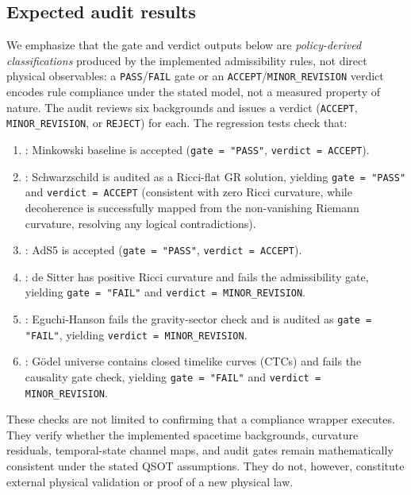 \subsection{Expected audit results}
We emphasize that the gate and verdict outputs below are \emph{policy-derived classifications} produced by the implemented admissibility rules, not direct physical observables: a \texttt{PASS}/\texttt{FAIL} gate or an \texttt{ACCEPT}/\texttt{MINOR\_REVISION} verdict encodes rule compliance under the stated model, not a measured property of nature. The audit reviews six backgrounds and issues a verdict (\texttt{ACCEPT}, \texttt{MINOR\_REVISION}, or \texttt{REJECT}) for each. The regression tests check that:
\begin{enumerate}
  \item {}: Minkowski baseline is accepted (\texttt{gate = "PASS"}, \texttt{verdict = ACCEPT}).
  \item {}: Schwarzschild is audited as a Ricci-flat GR solution, yielding \texttt{gate = "PASS"} and \texttt{verdict = ACCEPT} (consistent with zero Ricci curvature, while decoherence is successfully mapped from the non-vanishing Riemann curvature, resolving any logical contradictions).
  \item {}: AdS5 is accepted (\texttt{gate = "PASS"}, \texttt{verdict = ACCEPT}).
  \item {}: de Sitter has positive Ricci curvature and fails the admissibility gate, yielding \texttt{gate = "FAIL"} and \texttt{verdict = MINOR\_REVISION}.
  \item {}: Eguchi-Hanson fails the gravity-sector check and is audited as \texttt{gate = "FAIL"}, yielding \texttt{verdict = MINOR\_REVISION}.
  \item {}: Gödel universe contains closed timelike curves (CTCs) and fails the causality gate check, yielding \texttt{gate = "FAIL"} and \texttt{verdict = MINOR\_REVISION}.
\end{enumerate}

These checks are not limited to confirming that a compliance wrapper executes. They verify whether the implemented spacetime backgrounds, curvature residuals, temporal-state channel maps, and audit gates remain mathematically consistent under the stated QSOT assumptions. They do not, however, constitute external physical validation or proof of a new physical law.
